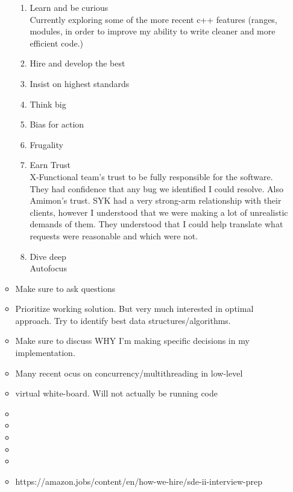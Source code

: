 \documentclass{article}
\begin{document}
\begin{itemize}
\begin{itemize}
\begin{enumerate}
				  	\item Learn and be curious \\
						Currently exploring some of the more recent c++ features (ranges, modules, in order to improve my ability to write cleaner and more efficient code.)
				  	\item Hire and develop the best
				  	\item Insist on highest standards \\
				  	\item Think big
				  	\item Bias for action \\
				  	\item Frugality
				  	\item Earn Trust \\
						X-Functional team's trust to be fully responsible for the software. They had confidence that any bug we identified I could resolve.
						Also Amimon's trust. SYK had a very strong-arm relationship with their clients, however I understood that we were making a lot of unrealistic demands of them. They understood that I could help translate what requests were reasonable and which were not.
				  	\item Dive deep \\
						Autofocus 
				  \end{enumerate}
		      \item Make sure to ask questions
		      \item Prioritize working solution. But very much interested in optimal approach. Try to identify best data structures/algorithms.
		      \item Make sure to discuss WHY I'm making specific decisions in my implementation.
		      \item Many recent ocus on concurrency/multithreading in low-level
		      \item virtual white-board. Will not actually be running code
		      \item 
		      \item 
		      \item 
		      \item 
		      \item 
		      \item https://amazon.jobs/content/en/how-we-hire/sde-ii-interview-prep
\end{itemize}
\end{itemize}
\end{document}
